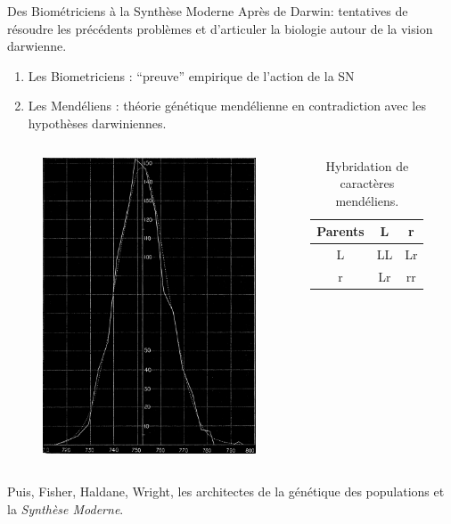 \documentclass[8pt, handout=show,notes=show]{beamer}
\begin{document}
\begin{frame}{Des Biométriciens à la Synthèse Moderne}
	Après de Darwin: tentatives de résoudre les précédents problèmes et d'articuler la biologie autour de la vision darwienne.
	\vfill

	\begin{enumerate}
		\item Les Biometriciens : ``preuve'' empirique de l'action de la SN
		\item Les Mendéliens : théorie génétique mendélienne en contradiction avec les hypothèses darwiniennes.
	\end{enumerate}
	\begin{columns}
		\begin{figure}[h]
			\begin{center}
				\includegraphics[width=.5\textwidth]{images/gauss1.png}
			\end{center}
			\caption{\cite{weldon1893certaincorrelatedvariationsincrangonvulgaris}}
		\end{figure}
		\begin{table}
			\begin{tabular}{c|cc}
				Parents & L & r \\\hline
				L & LL & Lr \\
				r & Lr & rr \\
			\end{tabular}
			\caption{Hybridation de caractères mendéliens.}
		\end{table}
	\end{columns}

	\vfill

	Puis, Fisher, Haldane, Wright, les architectes de la génétique des populations et la \emph{Synthèse Moderne}.

\end{frame}
\end{document}
